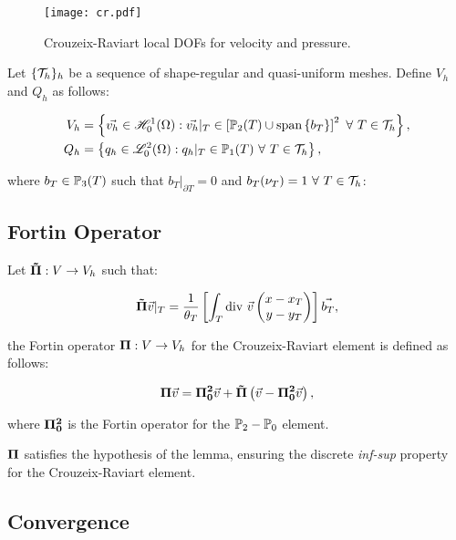 \begin{figure}[!ht]
	\centering
	\texttt{[image: cr.pdf]}
	\caption{Crouzeix-Raviart local DOFs for velocity and pressure.}
\end{figure}

Let $\{\mathcal{T}_h\}_h$ be a sequence of shape-regular and quasi-uniform meshes. Define $V_h$ and $Q_h$ as follows:

\begin{align}
    V_h &= \left\{ \vec{v_h} \in \mathscr{H}^1_0(\Omega): \vec{v_h} \vert_T \in \left[ \mathbb{P}_{2}(T) \cup \text{span} \left\{ b_T \right\} \right]^2 ~ \forall ~ T \in \mathcal{T}_h \right\}, \\
    Q_h &= \left\{ q_h \in \mathscr{L}^2_0(\Omega): q_h \vert_T \in \mathbb{P}_{1}(T) ~ \forall ~ T \in \mathcal{T}_h \right\},
\end{align}

where $b_T \in \mathbb{P}_{3}(T)$ such that $b_T \vert_{\partial T} = 0$ and $b_T(\nu_T) = 1 ~ \forall ~ T \in \mathcal{T}_h$:

\subsection{Fortin Operator}

Let $\bm{\tilde{\Pi}}: V \rightarrow V_h$ such that:

\begin{gather}
    \bm{\tilde{\Pi}} \vec{v} \vert_T = \frac{1}{\theta_T} \left[ \int_T \text{div } \vec{v} \begin{pmatrix}
        x - x_T \\
        y - y_T
    \end{pmatrix} \right] \vec{b_T},
\end{gather}

the Fortin operator $\bm{\Pi}: V \rightarrow V_h$ for the Crouzeix-Raviart element is defined as follows:

\begin{gather}
    \bm{\Pi} \vec{v} = \bm{\Pi^2_0} \vec{v} + \bm{\tilde{\Pi}} \left( \vec{v} - \bm{\Pi^2_0} \vec{v}\right),
\end{gather}

where $\bm{\Pi^2_0}$ is the Fortin operator for the $\mathbb{P}_{2}-\mathbb{P}_{0}$ element.

$\bm{\Pi}$ satisfies the hypothesis of the  lemma, ensuring the discrete \textit{inf-sup} property for the Crouzeix-Raviart element.

\newpage
\subsection{Convergence}


